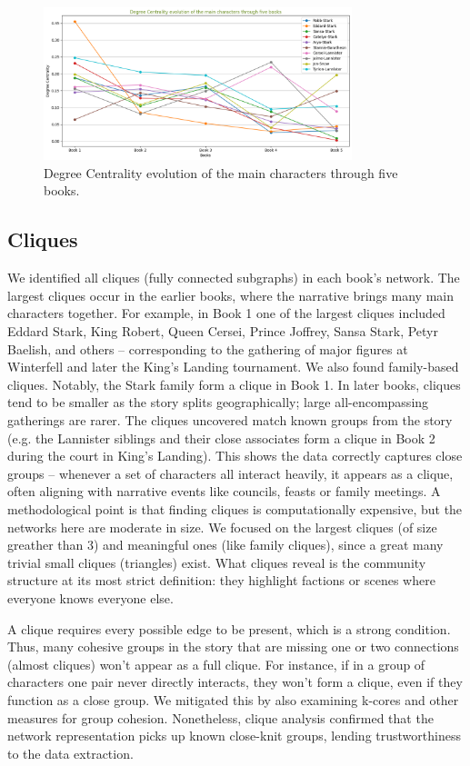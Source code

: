 \documentclass[12pt, a4paper]{article}
\begin{document}
\begin{figure}[htbp]
\centering
\includegraphics[width=0.8\textwidth]{deg-cent-evolution.png}
\caption{Degree Centrality evolution of the main characters through five books.}
\label{fig:deg_cent_evolution}
\end{figure}

\subsection*{Cliques}
We identified all cliques (fully connected subgraphs) in each book's network. The largest cliques occur in the earlier books, where the narrative brings many main characters together. For example, in Book 1 one of the largest cliques included Eddard Stark, King Robert, Queen Cersei, Prince Joffrey, Sansa Stark, Petyr Baelish, and others – corresponding to the gathering of major figures at Winterfell and later the King's Landing tournament. We also found family-based cliques. Notably, the Stark family form a clique in Book 1. In later books, cliques tend to be smaller as the story splits geographically; large all-encompassing gatherings are rarer. The cliques uncovered match known groups from the story (e.g. the Lannister siblings and their close associates form a clique in Book 2 during the court in King's Landing). This shows the data correctly captures close groups – whenever a set of characters all interact heavily, it appears as a clique, often aligning with narrative events like councils, feasts or family meetings. 
A methodological point is that finding cliques is computationally expensive, but the networks here are moderate in size. We focused on the largest cliques (of size greather than 3) and meaningful ones (like family cliques), since a great many trivial small cliques (triangles) exist. What cliques reveal is the community structure at its most strict definition: they highlight factions or scenes where everyone knows everyone else. 

A clique requires every possible edge to be present, which is a strong condition. Thus, many cohesive groups in the story that are missing one or two connections (almost cliques) won't appear as a full clique. For instance, if in a group of characters one pair never directly interacts, they won't form a clique, even if they function as a close group. We mitigated this by also examining k-cores and other measures for group cohesion. Nonetheless, clique analysis confirmed that the network representation picks up known close-knit groups, lending trustworthiness to the data extraction.
\end{document}
